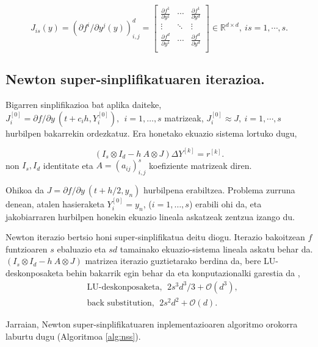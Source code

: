 \begin{equation*}
\label{eq:807}
J_{is}(y)=\left(\partial f^i/\partial y^j (y)\right)_{i,j}^d=
\begin{bmatrix}
    \frac{\partial f^1}{\partial y^1} & \cdots & \frac{\partial f^1}{\partial y^d}\\    
    \vdots & \ddots & \vdots \\    
    \frac{\partial f^d}{\partial y^1} & \cdots & \frac{\partial f^d}{\partial y^d}\\    
\end{bmatrix} \in \mathbb{R}^{d \times d},\ is=1,\cdots,s.
\end{equation*}

\subsection*{Newton super-sinplifikatuaren iterazioa.}

Bigarren sinplifikazioa bat aplika daiteke, $J_i^{[0]}=\partial f / \partial y \ (t+c_ih, Y_i^{[0]}), \ \  i=1,\dots,s$ matrizeak,  $J_i^{[0]} \approx J, \ i=1,\cdots,s$ hurbilpen bakarrekin ordezkatuz. Era honetako ekuazio sistema lortuko dugu,   

\begin{equation}
\label{eq:808}
(I_s \otimes I_d - h \ A \otimes J) \Delta Y^{[k]} = r^{[k]}.
\end{equation}
non $I_s,I_d$ identitate eta $A=(a_{ij})_{i,j}^s$ koefiziente matrizeak diren.

Ohikoa da $J=\partial f / \partial y \ (t+h/2, y_n)$ hurbilpena erabiltzea. Problema zurruna denean, atalen hasieraketa $Y_i^{[0]}=y_n$, ($i=1,\dots,s$)  erabili ohi da, eta jakobiarraren hurbilpen honekin ekuazio lineala askatzeak zentzua izango du.

Newton iterazio bertsio honi super-sinplifikatua deitu diogu. Iterazio bakoitzean $f$ funtzioaren $s$ ebaluazio eta $sd$ tamainako ekuazio-sistema lineala askatu behar da. $(I_s \otimes I_d - h \ A \otimes J)$ matrizea iterazio guztietarako berdina da,  bere LU-deskonposaketa behin bakarrik egin behar da eta konputazionalki garestia da \cite{Butcher1976} \cite{Hairer1996},
\begin{align*}
&\text{LU-deskonposaketa}, \ \ 2s^3d^3/3+\mathcal{O}(d^3), \\
&\text{back substitution}, \ \ 2s^2d^2+\mathcal{O}(d).
\end{align*}

Jarraian, Newton super-sinplifikatuaren inplementazioaren algoritmo orokorra laburtu dugu (Algoritmoa \ref{alg:nss}).


